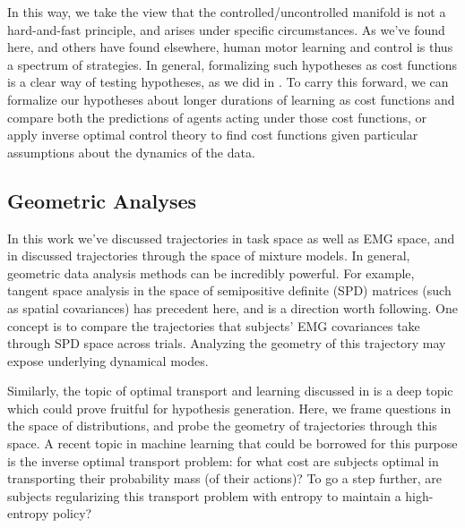 \documentclass[../main.tex]{subfiles}
\begin{document}
In this way, we take the view that the controlled/uncontrolled manifold is not a hard-and-fast principle, and arises under specific circumstances. As we've found here, and others have found elsewhere, human motor learning and control is thus a spectrum of strategies\cite{raczSpatiotemporalAnalysisReveals2013}. In general, formalizing such hypotheses as cost functions is a clear way of testing hypotheses, as we did in . To carry this forward, we can formalize our hypotheses about longer durations of learning as cost functions and compare both the predictions of agents acting under those cost functions, or apply inverse optimal control theory to find cost functions given particular assumptions about the dynamics of the data.




\subsection{Geometric Analyses}

In this work we've discussed trajectories in task space as well as EMG space, and in  discussed trajectories through the space of mixture models. In general, geometric data analysis methods can be incredibly powerful. For example, tangent space analysis in the space of semipositive definite (SPD) matrices (such as spatial covariances) has precedent here, and is a direction worth following. One concept is to compare the trajectories that subjects' EMG covariances take through SPD space across trials. Analyzing the geometry of this trajectory may expose underlying dynamical modes\cite{barachantCommonSpatialPattern2010,barachantClassificationCovarianceMatrices2013}.

Similarly, the topic of optimal transport and learning discussed in  is a deep topic which could prove fruitful for hypothesis generation. Here, we frame questions in the space of distributions, and probe the geometry of trajectories through this space. A recent topic in machine learning that could be borrowed for this purpose is the inverse optimal transport problem: for what cost are subjects optimal in transporting their probability mass (of their actions)? To go a step further, are subjects regularizing this transport problem with entropy to maintain a high-entropy policy?

\end{document}
